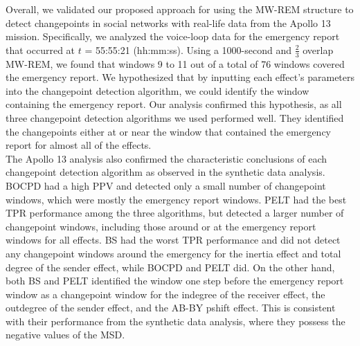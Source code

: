 \documentclass[]{interact}
\theoremstyle{plain}%
\theoremstyle{definition}
\theoremstyle{remark}
\begin{document}
{	Overall, we validated our proposed approach for using the MW-REM structure to detect changepoints in social networks with real-life data from the Apollo 13 mission. Specifically, we analyzed the voice-loop data for the emergency report that occurred at $t$ = 55:55:21 (hh:mm:ss). Using a 1000-second and $\frac{2}{3}$ overlap MW-REM, we found that windows 9 to 11 out of a total of 76 windows covered the emergency report. We hypothesized that by inputting each effect's parameters into the changepoint detection algorithm, we could identify the window containing the emergency report. Our analysis confirmed this hypothesis, as all three changepoint detection algorithms we used performed well. They identified the changepoints either at or near the window that contained the emergency report for almost all of the effects. \\ 
	
	The Apollo 13 analysis also confirmed the characteristic conclusions of each changepoint detection algorithm as observed in the synthetic data analysis. BOCPD had a high PPV and detected only a small number of changepoint windows, which were mostly the emergency report windows. PELT had the best TPR performance among the three algorithms, but detected a larger number of changepoint windows, including those around or at the emergency report windows for all effects. BS had the worst TPR performance and did not detect any changepoint windows around the emergency for the inertia effect and total degree of the sender effect, while BOCPD and PELT did. On the other hand, both BS and PELT identified the window one step before the emergency report window as a changepoint window for the indegree of the receiver effect, the outdegree of the sender effect, and the AB-BY pshift effect. This is consistent with their performance from the synthetic data analysis, where they possess the negative values of the MSD.
	
}
\end{document}
